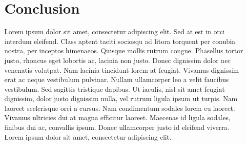 \section{Conclusion}\label{conclusion}

Lorem ipsum dolor sit amet, consectetur adipiscing elit. Sed at est in
orci interdum eleifend. Class aptent taciti sociosqu ad litora torquent
per conubia nostra, per inceptos himenaeos. Quisque mollis rutrum
congue. Phasellus tortor justo, rhoncus eget lobortis ac, lacinia non
justo. Donec dignissim dolor nec venenatis volutpat. Nam lacinia
tincidunt lorem at feugiat. Vivamus dignissim erat ac neque vestibulum
pulvinar. Nullam ullamcorper leo a velit faucibus vestibulum. Sed
sagittis tristique dapibus. Ut iaculis, nisl sit amet feugiat dignissim,
dolor justo dignissim nulla, vel rutrum ligula ipsum ut turpis. Nam
laoreet scelerisque orci a cursus. Nam condimentum sodales lorem eu
laoreet. Vivamus ultricies dui at magna efficitur laoreet. Maecenas id
ligula sodales, finibus dui ac, convallis ipsum. Donec ullamcorper justo
id eleifend viverra. Lorem ipsum dolor sit amet, consectetur adipiscing
elit.
